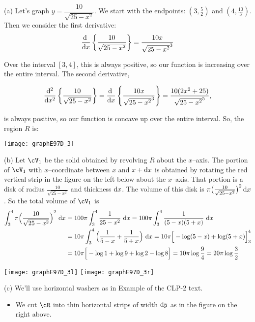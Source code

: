 \begin{solution} (a)
Let's graph $y=\dfrac{10}{\sqrt{25-x^2}}$.
We start with the endpoints: $(3,\frac{5}{2})$ and $(4,\frac{10}{3})$. Then we consider the first derivative:
\[\diff{}{x}\left\{\frac{10}{\sqrt{25-x^2}}\right\} = \frac{10x}{\sqrt{25-x^2}^3}\]

Over the interval $[3,4]$, this is always positive, so our function is increasing over the entire interval. The second derivative,

\[\ddiff{2}{}{x}\left\{\frac{10}{\sqrt{25-x^2}}\right\}=\diff{}{x}\left\{\frac{10x}{\sqrt{25-x^2}^3}\right\} = \frac{10(2x^2+25)}{\sqrt{25-x^2}^5},\]

is always positive, so our function is concave up over the entire interval. So,
the region $R$ is:

\begin{center}
       \texttt{[image: graphE97D\_3]}
\end{center}




\noindent (b)
Let $\cV_1$ be the solid obtained by revolving
$R$ about the $x$--axis. The portion of $\cV_1$ with $x$--coordinate
between $x$ and $x+\mathrm{d}x$ is obtained by rotating the red vertical strip in
the figure on the left below about the $x$--axis.
That portion is a disk of radius $\frac{10}{\sqrt{25-x^2}}$ and thickness
$\mathrm{d}x$. The volume of this disk is $\pi\big(\frac{10}{\sqrt{25-x^2}}\big)^2\,\mathrm{d}x$.
So the total volume of $\cV_1$ is
\begin{align*}
\int_3^4\pi{\Big(\frac{10}{\sqrt{25-x^2}}\Big)}^2\ \mathrm{d}x
&=100\pi\int_3^4\frac{1}{25-x^2}\ \mathrm{d}x
=100\pi\int_3^4\frac{1}{(5-x)(5+x)}\ \mathrm{d}x \\
&=10\pi\int_3^4\Big(\frac{1}{5-x}+\frac{1}{5+x}\Big)\ \mathrm{d}x
=10\pi\Big[-\log(5-x)+\log(5+x)\Big]_3^4 \\
&=10\pi\Big[-\log1+\log9+\log2-\log8\Big]
=10\pi\log\frac{9}{4}=20\pi\log\frac{3}{2}
\end{align*}

\begin{center}
       \texttt{[image: graphE97D\_3l]}\qquad\qquad
       \texttt{[image: graphE97D\_3r]}
\end{center}



\noindent (c)
We'll use horizontal washers as in Example  
of the %
CLP-2 text.
 \begin{itemize}
\item We cut $\cR$ into thin horizontal  strips of width $\mathrm{d}y$ as in
the figure on the right above.


\end{itemize}
\end{solution}
